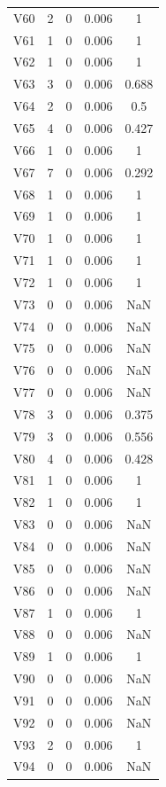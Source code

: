 \documentclass[a4paper, 12pt, openright, oneside, german, french, english, brazil]{abntex2}
\begin{document}
\begin{SingleSpace}
\begin{footnotesize}
\begin{center}
\begin{longtable}{c c c c c}
					V60 & 2 & 0 & 0.006 & 1 \\ 
					V61 & 1 & 0 & 0.006 & 1 \\ 
					V62 & 1 & 0 & 0.006 & 1 \\ 
					V63 & 3 & 0 & 0.006 & 0.688 \\ 
					V64 & 2 & 0 & 0.006 & 0.5 \\ 
					V65 & 4 & 0 & 0.006 & 0.427 \\ 
					V66 & 1 & 0 & 0.006 & 1 \\ 
					V67 & 7 & 0 & 0.006 & 0.292 \\ 
					V68 & 1 & 0 & 0.006 & 1 \\ 
					V69 & 1 & 0 & 0.006 & 1 \\ 
					V70 & 1 & 0 & 0.006 & 1 \\ 
					V71 & 1 & 0 & 0.006 & 1 \\ 
					V72 & 1 & 0 & 0.006 & 1 \\ 
					V73 & 0 & 0 & 0.006 & NaN \\ 
					V74 & 0 & 0 & 0.006 & NaN \\ 
					V75 & 0 & 0 & 0.006 & NaN \\ 
					V76 & 0 & 0 & 0.006 & NaN \\ 
					V77 & 0 & 0 & 0.006 & NaN \\ 
					V78 & 3 & 0 & 0.006 & 0.375 \\ 
					V79 & 3 & 0 & 0.006 & 0.556 \\ 
					V80 & 4 & 0 & 0.006 & 0.428 \\ 
					V81 & 1 & 0 & 0.006 & 1 \\ 
					V82 & 1 & 0 & 0.006 & 1 \\ 
					V83 & 0 & 0 & 0.006 & NaN \\ 
					V84 & 0 & 0 & 0.006 & NaN \\ 
					V85 & 0 & 0 & 0.006 & NaN \\ 
					V86 & 0 & 0 & 0.006 & NaN \\ 
					V87 & 1 & 0 & 0.006 & 1 \\ 
					V88 & 0 & 0 & 0.006 & NaN \\ 
					V89 & 1 & 0 & 0.006 & 1 \\ 
					V90 & 0 & 0 & 0.006 & NaN \\ 
					V91 & 0 & 0 & 0.006 & NaN \\ 
					V92 & 0 & 0 & 0.006 & NaN \\ 
					V93 & 2 & 0 & 0.006 & 1 \\ 
					V94 & 0 & 0 & 0.006 & NaN \\ 

\end{longtable}
\end{center}
\end{footnotesize}
\end{SingleSpace}
\end{document}

